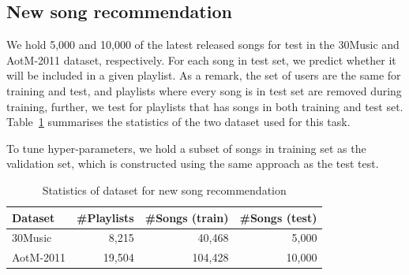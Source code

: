 \subsection{New song recommendation}
\label{ssec:newsongrec}

We hold 5,000 and 10,000 of the latest released songs for test in the 30Music and AotM-2011 dataset, respectively.
For each song in test set, we predict whether it will be included in a given playlist.
As a remark, the set of users are the same for training and test, 
and playlists where every song is in test set are removed during training,
further, we test for playlists that has songs in both training and test set.
Table~\ref{tab:stats_newsongrec} summarises the statistics of the two dataset used for this task.

To tune hyper-parameters, we hold a subset of songs in training set as the validation set, 
which is constructed using the same approach as the test test.

\begin{table}[!h]
\centering
\caption{Statistics of dataset for new song recommendation}
\label{tab:stats_newsongrec}
\small
\begin{tabular}{l|rrr}
\toprule
Dataset   & \#Playlists & \#Songs (train) & \#Songs (test) \\
\midrule
30Music   & 8,215       & 40,468          & 5,000 \\
AotM-2011 & 19,504      & 104,428         & 10,000 \\
\bottomrule
\end{tabular}
\end{table}

%

